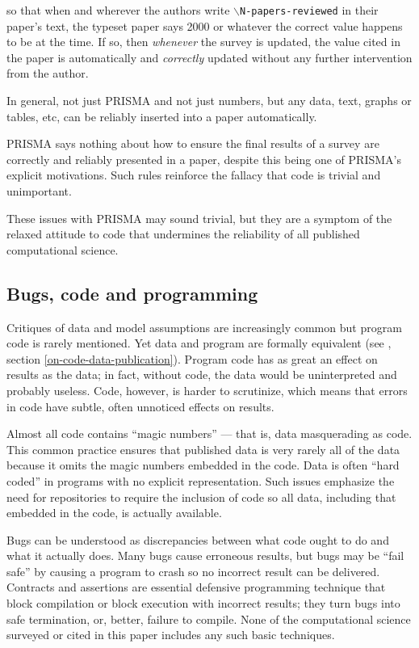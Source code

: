 \documentclass{comjnl}
\begin{document}
so that when and wherever the authors write \texttt{$\backslash$N-papers-reviewed} in their paper's text, the typeset paper says 2000 or whatever the correct value happens to be at the time. If so, then \emph{whenever\/} the survey is updated, the value cited in the paper is automatically and \emph{correctly\/} updated without any further intervention from the author. 

In general, not just PRISMA and not just numbers, but any data, text, graphs or tables, etc, can be reliably inserted into a paper automatically. 

PRISMA says nothing about how to ensure the final results of a survey are correctly and reliably presented in a paper, despite this being one of PRISMA's explicit motivations. Such rules reinforce the fallacy that code is trivial and unimportant. 

These issues with PRISMA may sound trivial, but they are a symptom of the relaxed attitude to code that undermines the reliability of all published computational science.

\subsection{Bugs, code and programming}\label{knowledge}
Critiques of data and model assumptions are increasingly common \cite{critiques,diagnosis-reviews} but program code is rarely mentioned. Yet data and program are formally equivalent (see \supplement, section \ref{on-code-data-publication}). Program code has as great an effect on results as the data; in fact, without code, the data would be uninterpreted and probably useless. Code, however, is harder to scrutinize, which means that errors in code have subtle, often unnoticed effects on results.

Almost all code contains ``magic numbers'' --- that is, data masquerading as code. This common practice ensures that published data is very rarely all of the data because it omits the magic numbers embedded in the code. Data is often ``hard coded'' in programs with no explicit representation. Such issues emphasize the need for repositories to require the inclusion of code so all data, including that embedded in the code, is actually available. 

Bugs can be understood as discrepancies between what code ought to do and what it actually does. Many bugs cause erroneous results, but bugs may be ``fail safe'' by causing a program to crash so no incorrect result can be delivered. Contracts and assertions are essential defensive programming technique that block compilation or block execution with incorrect results; they turn bugs into safe termination, or, better, failure to compile. None of the computational science surveyed or cited in this paper includes any such basic techniques. 
\end{document}
